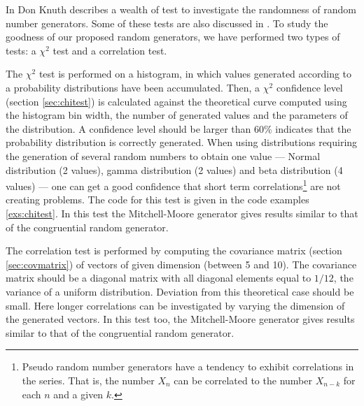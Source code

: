 In \cite{Knuth2} Don Knuth describes a wealth of test to
investigate the randomness of random number generators. Some of
these tests are also discussed in \cite{LawKel}. To study the
goodness of our proposed random generators, we have performed two
types of tests: a $\chi^2$ test and a correlation test.

The $\chi^2$ test is performed on a histogram, in which values
generated according to a probability distributions have been
accumulated. Then, a $\chi^2$ confidence level (\cf section
\ref{sec:chitest}) is calculated against the theoretical curve
computed using the histogram bin width, the number of generated
values and the parameters of the distribution. A confidence level
should be larger than $60\%$ indicates that the probability
distribution is correctly generated. When using distributions
requiring the generation of several random numbers to obtain one
value --- Normal distribution (2 values), gamma distribution (2
values) and beta distribution (4 values)
--- one can get a good confidence that short term
correlations\footnote{Pseudo random number generators have a
tendency to exhibit correlations in the series. That is, the
number $X_n$ can be correlated to the number $X_{n-k}$ for each
$n$ and a given $k$.} are not creating problems. The code for this
test is given in the code examples \ref{exs:chitest}. In this test the Mitchell-Moore
generator gives results similar to that of the congruential random
generator.

The correlation test is performed by computing the covariance
matrix (\cf section \ref{sec:covmatrix}) of vectors of given
dimension (between 5 and 10). The covariance matrix should be a
diagonal matrix with all diagonal elements equal to $1/12$, the
variance of a uniform distribution. Deviation from this
theoretical case should be small. Here longer correlations can be
investigated by varying the dimension of the generated vectors. In
this test too, the Mitchell-Moore generator gives results similar
to that of the congruential random generator.

